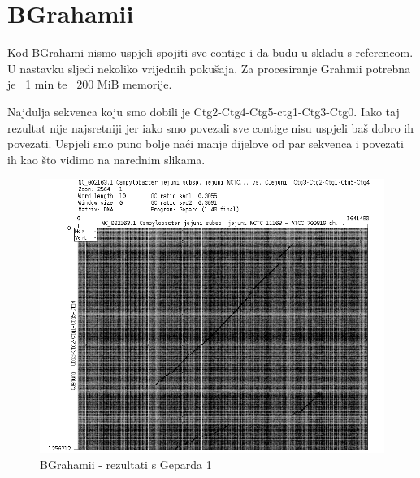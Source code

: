 \section{BGrahamii}
Kod BGrahami nismo uspjeli spojiti sve contige i da budu u skladu s referencom. U nastavku sljedi nekoliko vrijednih pokušaja. Za procesiranje Grahmii potrebna je ~1 min te ~200 MiB memorije. 


Najdulja sekvenca koju smo dobili je Ctg2-Ctg4-Ctg5-ctg1-Ctg3-Ctg0. Iako taj rezultat nije najsretniji  jer iako smo povezali sve contige nisu uspjeli baš dobro ih povezati. Uspjeli smo puno bolje naći manje dijelove od par sekvenca i povezati ih kao što vidimo na narednim slikama.


\begin{figure}[H]
    \centering
    \includegraphics[scale=0.5]{img/Grah8.png}
    \caption{BGrahamii - rezultati s Geparda 1}
    \label{fig:grahmi1}
\end{figure}


